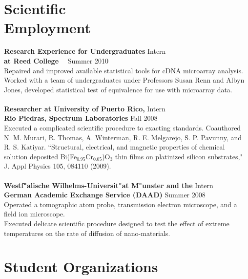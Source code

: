 \documentclass[margin,line]{resume}
\begin{document}
\begin{resume}
    \section{\mysidestyle Scientific\\Employment} 
\textbf{Research Experience for Undergraduates} \hfill  Intern \\ 
\textbf{at Reed College} \ \  \hfill Summer 2010 \\
Repaired and improved available statistical tools for cDNA microarray analysis. Worked with a team of undergraduates under Professors Susan Renn and Albyn Jones, developed statistical test of equivalence for use with microarray data. \\
\vspace{-2mm} \\
\textbf{Researcher at University of Puerto Rico,} \hfill  Intern\\
\textbf{Rio Piedras, Spectrum Laboratories} \hfill Fall 2008	\\
Executed a complicated scientific procedure to exacting standards. Coauthored N. M. Murari, R. Thomas, A. Winterman, R. E. Melgarejo, S. P. Pavunny, and R. S. Katiyar. ``Structural, electrical, and magnetic properties of chemical solution deposited Bi(Fe$_{0.95}$Cr$_{0.05}$)O$_3$ thin films on platinized silicon substrates," J. Appl Physics 105, 084110 (2009). 
\\\vspace{-2mm}\\
\textbf{Westf"alische Wilhelms-Universit"at M"unster and the} \hfill  Intern \\
\textbf{German Academic Exchange Service (DAAD)} \hfill Summer 2008	\\
Operated a tomographic atom probe, transmission electron microscope, and a field ion microscope. \\ Executed delicate scientific procedure designed to test the effect of extreme temperatures on the rate of diffusion of nano-materials.

\section{\mysidestyle Student Organizations }


\end{resume}
\end{document}

